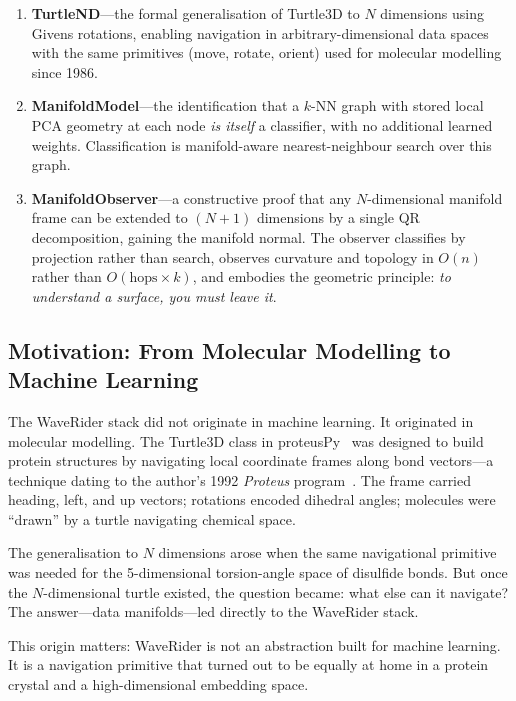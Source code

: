 \documentclass[12pt,letterpaper]{article}
\begin{document}
\begin{enumerate}[leftmargin=*]
\item \textbf{TurtleND}---the formal generalisation of Turtle3D to $N$
  dimensions using Givens rotations, enabling navigation in
  arbitrary-dimensional data spaces with the same primitives (move, rotate,
  orient) used for molecular modelling since 1986.

\item \textbf{ManifoldModel}---the identification that a $k$-NN graph with
  stored local PCA geometry at each node \emph{is itself} a classifier, with no
  additional learned weights.  Classification is manifold-aware nearest-neighbour
  search over this graph.

\item \textbf{ManifoldObserver}---a constructive proof that any $N$-dimensional
  manifold frame can be extended to $(N+1)$ dimensions by a single QR
  decomposition, gaining the manifold normal.  The observer classifies by
  projection rather than search, observes curvature and topology in $O(n)$
  rather than $O(\text{hops} \times k)$, and embodies the geometric principle:
  \emph{to understand a surface, you must leave it}.
\end{enumerate}

\subsection{Motivation: From Molecular Modelling to Machine Learning}

The WaveRider stack did not originate in machine learning.  It originated in
molecular modelling.  The Turtle3D class in
proteusPy~\cite{suchanek24joss} was designed to build protein structures by
navigating local coordinate frames along bond vectors---a technique dating to the
author's 1992 \emph{Proteus} program~\cite{suchanek92}.  The frame carried
heading, left, and up vectors; rotations encoded dihedral angles; molecules were
``drawn'' by a turtle navigating chemical space.

The generalisation to $N$ dimensions arose when the same navigational primitive
was needed for the 5-dimensional torsion-angle space of disulfide bonds.  But
once the $N$-dimensional turtle existed, the question became: what else can it
navigate?  The answer---data manifolds---led directly to the WaveRider stack.

This origin matters: WaveRider is not an abstraction built for machine learning.
It is a navigation primitive that turned out to be equally at home in a protein
crystal and a high-dimensional embedding space.
\end{document}
